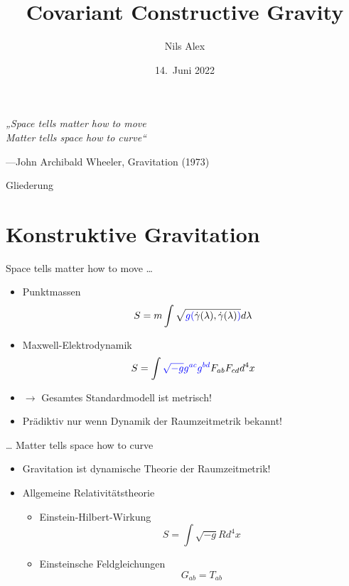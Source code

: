 \documentclass{beamer}
\title{Covariant Constructive Gravity}
\date{14.\ Juni 2022}
\author{Nils Alex}
\institute{FAU Erlangen-Nürnberg}
\begin{document}
    \maketitle

    \begin{frame}{}
        \Large
        \textit{„Space tells matter how to move \\
        Matter tells space how to curve“}

        \normalsize
        ---John Archibald Wheeler, Gravitation (1973)
    \end{frame}

    \begin{frame}{Gliederung}
        \tableofcontents[pausesections]
    \end{frame}


    \section{Konstruktive Gravitation}\label{sec:constructive-gravity}

    \begin{frame}{Space tells matter how to move \ldots}
        \begin{itemize}
            \item Punktmassen
            \[ S = m \int \sqrt{{\color{blue}g(}\dot\gamma(\lambda),\dot\gamma(\lambda){\color{blue})}} d\lambda \]
            \item Maxwell-Elektrodynamik
            \[ S = \int {\color{blue}\sqrt{-g}g^{ac}g^{bd}} F_{ab} F_{cd} d^4 x \]
            \item $\rightarrow$ Gesamtes Standardmodell ist metrisch!
            \item Prädiktiv nur wenn Dynamik der Raumzeitmetrik bekannt!
        \end{itemize}
    \end{frame}

    \begin{frame}{\ldots{} Matter tells space how to curve}
        \begin{itemize}
            \item Gravitation ist dynamische Theorie der Raumzeitmetrik!
            \item Allgemeine Relativitätstheorie
            \begin{itemize}
                \item Einstein-Hilbert-Wirkung
                \[ S = \int \sqrt{-g} R d^4 x \]
                \item Einsteinsche Feldgleichungen
                \[ G_{ab} = T_{ab} \]
            \end{itemize}
        \end{itemize}
    \end{frame}
\end{document}
